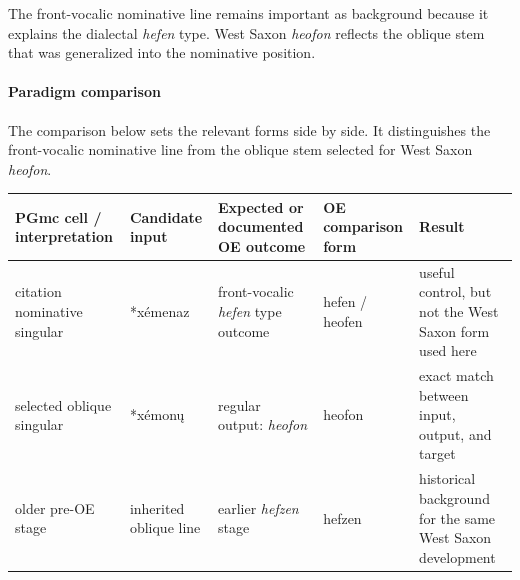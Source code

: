 \documentclass[
  british,
  a4paper,
]{article}
\newcounter{none} %
\begin{document}
The front-vocalic nominative line remains important as background
because it explains the dialectal \emph{hefen} type. West Saxon
\emph{heofon} reflects the oblique stem that was generalized into the
nominative position.

\paragraph{Paradigm comparison}\label{paradigm-comparison-8}

The comparison below sets the relevant forms side by side. It
distinguishes the front-vocalic nominative line from the oblique stem
selected for West Saxon \emph{heofon}.

{\def\LTcaptype{none} %
\begin{longtable}[]{@{}
  >{\raggedright\arraybackslash}p{}
  >{\raggedright\arraybackslash}p{}
  >{\raggedright\arraybackslash}p{}
  >{\raggedright\arraybackslash}p{}
  >{\raggedright\arraybackslash}p{}@{}}
\toprule\noalign{}
\begin{minipage}[b]{\linewidth}\raggedright
PGmc cell / interpretation
\end{minipage} & \begin{minipage}[b]{\linewidth}\raggedright
Candidate input
\end{minipage} & \begin{minipage}[b]{\linewidth}\raggedright
Expected or documented OE outcome
\end{minipage} & \begin{minipage}[b]{\linewidth}\raggedright
OE comparison form
\end{minipage} & \begin{minipage}[b]{\linewidth}\raggedright
Result
\end{minipage} \\
\midrule\noalign{}
\endhead
\bottomrule\noalign{}
\endlastfoot
citation nominative singular & *xémenaz & front-vocalic \emph{hefen}
type outcome & hefen / heofen & useful control, but not the West Saxon
form used here \\
selected oblique singular & *xémonų & regular output: \emph{heofon} &
heofon & exact match between input, output, and target \\
older pre-OE stage & inherited oblique line & earlier \emph{hefzen}
stage & hefzen & historical background for the same West Saxon
development \\
\end{longtable}
}
\end{document}
